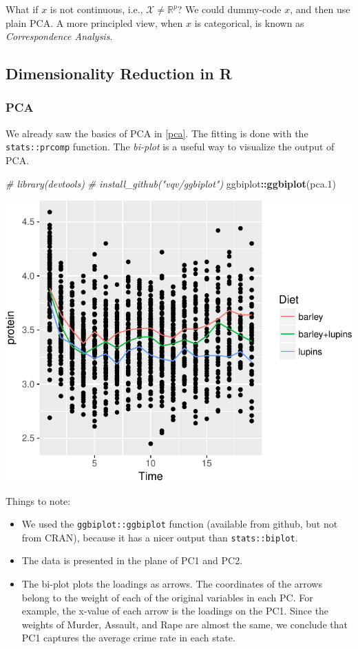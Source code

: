\documentclass[]{book}
\newenvironment{Shaded}{\begin{snugshade}}{\end{snugshade}}
\newcommand{\CommentTok}[1]{\textcolor[rgb]{0.56,0.35,0.01}{\textit{#1}}}
\newcommand{\FloatTok}[1]{\textcolor[rgb]{0.00,0.00,0.81}{#1}}
\newcommand{\KeywordTok}[1]{\textcolor[rgb]{0.13,0.29,0.53}{\textbf{#1}}}
\newcommand{\NormalTok}[1]{#1}
\newcommand{\OperatorTok}[1]{\textcolor[rgb]{0.81,0.36,0.00}{\textbf{#1}}}
\providecommand{\tightlist}{%
  \setlength{\itemsep}{0pt}\setlength{\parskip}{0pt}}
\theoremstyle{definition}
\theoremstyle{definition}
\theoremstyle{definition}
\theoremstyle{remark}
\begin{document}
What if \(x\) is not continuous, i.e., \(\mathcal{X}\neq \mathbb{R}^p\)?
We could dummy-code \(x\), and then use plain PCA.
A more principled view, when \(x\) is categorical, is known as \emph{Correspondence Analysis}.

\hypertarget{dimensionality-reduction-in-r}{%
\subsection{Dimensionality Reduction in R}\label{dimensionality-reduction-in-r}}

\hypertarget{pca-in-r}{%
\subsubsection{PCA}\label{pca-in-r}}

We already saw the basics of PCA in \ref{pca}.
The fitting is done with the \texttt{stats::prcomp} function.
The \emph{bi-plot} is a useful way to visualize the output of PCA.

\begin{Shaded}
\begin{Highlighting}[]
\CommentTok{# library(devtools)}
\CommentTok{# install_github("vqv/ggbiplot")}
\NormalTok{ggbiplot}\OperatorTok{::}\KeywordTok{ggbiplot}\NormalTok{(pca}\FloatTok{.1}\NormalTok{) }
\end{Highlighting}
\end{Shaded}

\includegraphics[width=0.5\linewidth]{Rcourse_files/figure-latex/unnamed-chunk-235-1}

Things to note:

\begin{itemize}
\tightlist
\item
  We used the \texttt{ggbiplot::ggbiplot} function (available from github, but not from CRAN), because it has a nicer output than \texttt{stats::biplot}.
\item
  The data is presented in the plane of PC1 and PC2.
\item
  The bi-plot plots the loadings as arrows. The coordinates of the arrows belong to the weight of each of the original variables in each PC.
  For example, the x-value of each arrow is the loadings on the PC1.
  Since the weights of Murder, Assault, and Rape are almost the same, we conclude that PC1 captures the average crime rate in each state.
\end{itemize}
\end{document}
